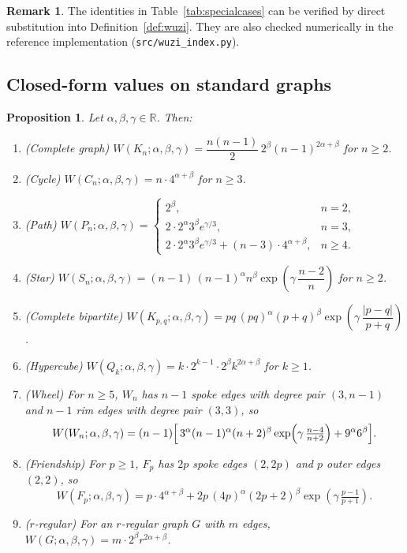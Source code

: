 \documentclass[11pt,a4paper]{article}
\newtheorem{proposition}[theorem]{Proposition}
\theoremstyle{definition}
\newtheorem{remark}[theorem]{Remark}
\newcommand{\Wuzi}{W(G;\alpha,\beta,\gamma)}
\begin{document}
\begin{remark}\label{rem:identities}
The identities in Table~\ref{tab:specialcases} can be verified by
direct substitution into Definition~\ref{def:wuzi}. They are also
checked numerically in the reference implementation
(\texttt{src/wuzi\_index.py}).
\end{remark}

\subsection{Closed-form values on standard graphs}\label{sec:closedforms}

\begin{proposition}\label{prop:closedforms}
Let $\alpha,\beta,\gamma\in\mathbb{R}$. Then:
\begin{enumerate}
\item (Complete graph) $W(K_n;\alpha,\beta,\gamma) =
  \dfrac{n(n-1)}{2}\,2^{\beta}(n-1)^{2\alpha+\beta}$ for $n\ge 2$.
\item (Cycle) $W(C_n;\alpha,\beta,\gamma) = n\cdot 4^{\alpha+\beta}$
  for $n\ge 3$.
\item (Path)
  $W(P_n;\alpha,\beta,\gamma) =
  \begin{cases}
    2^{\beta}, & n=2,\\[2pt]
    2\cdot 2^{\alpha}3^{\beta}e^{\gamma/3}, & n=3,\\[2pt]
    2\cdot 2^{\alpha}3^{\beta}e^{\gamma/3} + (n-3)\cdot 4^{\alpha+\beta},
       & n\ge 4.
  \end{cases}$
\item (Star) $W(S_n;\alpha,\beta,\gamma) =
  (n-1)\,(n-1)^{\alpha} n^{\beta} \exp\!\left(\gamma\,\dfrac{n-2}{n}\right)$
  for $n\ge 2$.
\item (Complete bipartite) $W(K_{p,q};\alpha,\beta,\gamma) =
  pq\,(pq)^{\alpha}(p+q)^{\beta}\exp\!\left(\gamma\,\dfrac{|p-q|}{p+q}\right)$.
\item (Hypercube) $W(Q_k;\alpha,\beta,\gamma) =
  k\cdot 2^{k-1}\cdot 2^{\beta} k^{2\alpha+\beta}$ for $k\ge 1$.
\item (Wheel) For $n\ge 5$, $W_n$ has $n-1$ spoke edges with degree
  pair $(3,n-1)$ and $n-1$ rim edges with degree pair $(3,3)$, so
  \[
  W(W_n;\alpha,\beta,\gamma)=
  (n-1)\Bigl[\,3^\alpha (n-1)^\alpha (n+2)^\beta
     \exp\!\left(\gamma\,\tfrac{n-4}{n+2}\right)
     +9^\alpha 6^\beta\Bigr].
  \]
\item (Friendship) For $p\ge 1$, $F_p$ has $2p$ spoke edges
  $(2,2p)$ and $p$ outer edges $(2,2)$, so
  \[
  W(F_p;\alpha,\beta,\gamma)=
  p\cdot 4^{\alpha+\beta}
  +2p\,(4p)^{\alpha}(2p+2)^{\beta}
     \exp\!\left(\gamma\,\tfrac{p-1}{p+1}\right).
  \]
\item ($r$-regular) For an $r$-regular graph $G$ with $m$ edges,
  $\Wuzi=m\cdot 2^{\beta} r^{2\alpha+\beta}$.
\end{enumerate}
\end{proposition}
\end{document}
